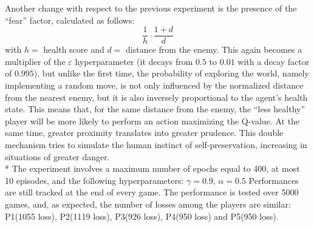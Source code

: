 Another change with respect to the previous experiment is the presence of the ``fear'' factor, calculated as follows:
$$\frac{1}{h}\cdot\frac{1+d}{d}$$
with $h =$ health score and $d =$ distance from the enemy.
This again becomes a multiplier of the $\varepsilon$ hyperparameter (it decays from $0.5$ to $0.01$ with a decay factor of $0.995$), but unlike the first time, the probability of exploring the world, namely implementing a random move, is not only influenced by the normalized distance from the nearest enemy, but it is also inversely proportional to the agent's health state. 
This means that, for the same distance from the enemy, the ``less healthy'' player will be more likely to perform an action maximizing the Q-value. At the same time, greater proximity translates into greater prudence. 
This double mechanism tries to simulate the human instinct of self-preservation, increasing in situations of greater danger.\\*
The experiment involves a maximum number of epochs equal to 400,
at most 10 episodes, and the following hyperparameters: $\gamma = 0.9$, $\alpha = 0.5$
Performances are still tracked at the end of every game.
The performance is tested over 5000 games, and, as expected, the number of losses among the players are similar: P1(1055 loss),  P2(1119 loss), P3(926 loss), P4(950 loss) and P5(950 loss).

